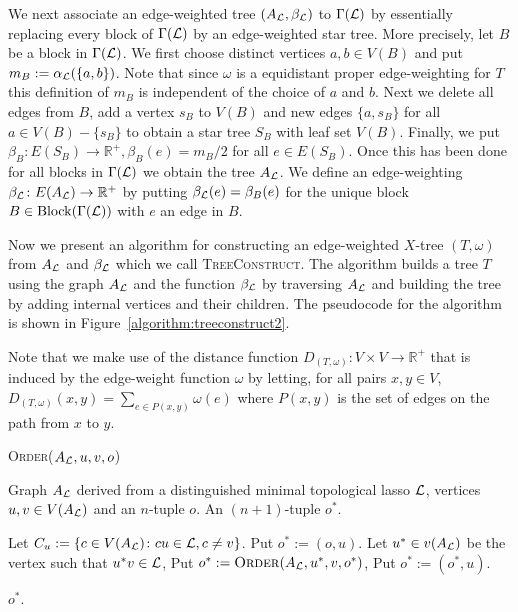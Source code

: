 We next associate an edge-weighted tree $(A_{{\mathcal L}},\beta_{{\mathcal L}})$ to $\Gamma({\mathcal L})$ by
essentially replacing every block of $\Gamma({\mathcal L})$ by an edge-weighted star
tree.  More precisely, let $B$ be a block in $\Gamma({\mathcal L})$.  We first choose
distinct vertices $a,b \in V(B)$ and put $m_B := \alpha_{{\mathcal L}}(\{a,b\})$.  Note
that since $\omega$ is a equidistant proper edge-weighting for $T$ this
definition of $m_B$ is independent of the choice of $a$ and $b$.  Next we
delete all edges from $B$, add a vertex $s_B$ to $V(B)$ and new edges
$\{a,s_B\}$ for all $a \in V(B) - \{s_B\}$ to obtain a star tree $S_B$ with
leaf set $V(B)$.  Finally, we put $\beta_B \colon E(S_B) \to \mathbb{R}^+,
\beta_B(e) = m_B/2$ for all $e \in E(S_B)$.  Once this has been done for all
blocks in $\Gamma({\mathcal L})$ we obtain the tree $A_{{\mathcal L}}$.  We define an
edge-weighting $\beta_{{\mathcal L}} \colon E(A_{{\mathcal L}}) \to \mathbb{R}^+$ by putting
$\beta_{{\mathcal L}}(e) = \beta_B(e)$ for the unique block $B \in \operatorname*{Block}(\Gamma({\mathcal L}))$
with $e$ an edge in $B$.

Now we present an algorithm for constructing an edge-weighted $X$-tree
$(T,\omega)$ from $A_{{\mathcal L}}$ and $\beta_{{\mathcal L}}$ which we call \textsc{TreeConstruct}.
The algorithm builds a tree $T$ using the graph $A_{{\mathcal L}}$ and the function
$\beta_{{\mathcal L}}$ by traversing $A_{{\mathcal L}}$ and building the tree by adding internal vertices
and their children.  The pseudocode for the algorithm is shown in
Figure~\ref{algorithm:treeconstruct2}.

Note that we make use of the distance function $D_{(T,\omega)} \colon V
\times V \to \mathbb{R}^+$ that is induced by the edge-weight function
$\omega$ by letting, for all pairs $x,y \in V$, $D_{(T,\omega)}(x,y)
= \sum_{e \in P(x,y)} \omega(e)$ where $P(x,y)$ is the set of edges on the
path from $x$ to $y$.

\begin{algorithm}
  \caption{\textsc{Order}($A_{{\mathcal L}},u,v,o$)}
  \label{algorithm:order}
  
  \begin{algorithmic}
    \Require Graph $A_{{\mathcal L}}$ derived from a distinguished minimal topological
    lasso ${\mathcal L}$, vertices $u,v \in V(A_{{\mathcal L}})$ and an $n$-tuple $o$.
    \Ensure An $(n+1)$-tuple $o^*$.

    \State Let $C_u := \{c \in V(A_{{\mathcal L}}) \colon cu \in {\mathcal L}, c \neq v\}$.
    \State Put $o^* := (o,u)$.
    \State Let $u^* \in v(A_{{\mathcal L}})$ be the vertex such that $u^*v \in {\mathcal L}$,
    \State Put $o^* := \text{\textsc{Order}}(A_{{\mathcal L}}, u^*, v, o^*)$,
    \State Put $o^* := (o^*, u)$.
    \EndIf
    \EndFor

    \State \Return $o^*$.
  \end{algorithmic}
\end{algorithm}

